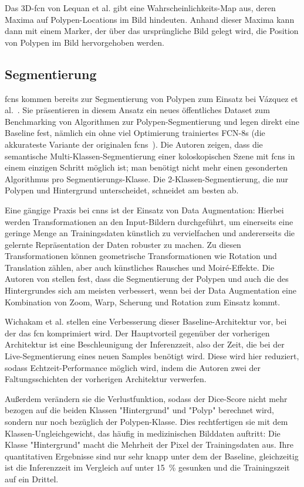 Das 3D-\gls{fcn} von Lequan et al. gibt eine Wahrscheinlichkeits-Map aus, deren Maxima auf Polypen-Locations im Bild hindeuten.
Anhand dieser Maxima kann dann mit einem Marker, der über das ursprüngliche Bild gelegt wird, die Position von Polypen im Bild hervorgehoben werden.

\subsection{Segmentierung}

\glspl{fcn} kommen bereits zur Segmentierung von Polypen zum Einsatz bei Vázquez et al.~\cite{Vazquez.2017}.
Sie präsentieren in diesem Ansatz ein neues öffentliches Dataset zum Benchmarking von Algorithmen zur Polypen-Segmentierung und legen direkt eine Baseline fest, nämlich ein ohne viel Optimierung trainiertes FCN-8s (die akkurateste Variante der originalen \glspl{fcn}~\cite{Long.2015}).
Die Autoren zeigen, dass die semantische Multi-Klassen-Segmentierung einer koloskopischen Szene mit \glspl{fcn} in einem einzigen Schritt möglich ist; man benötigt nicht mehr einen gesonderten Algorithmus pro Segmentierungs-Klasse.
Die 2-Klassen-Segmentierung, die nur Polypen und Hintergrund unterscheidet, schneidet am besten ab.

Eine gängige Praxis bei \glspl{cnn} ist der Einsatz von Data Augmentation:
Hierbei werden Transformationen an den Input-Bildern durchgeführt, um einerseits eine geringe Menge an Trainingsdaten künstlich zu vervielfachen und andererseits die gelernte Repräsentation der Daten robuster zu machen.
Zu diesen Transformationen können geometrische Transformationen wie Rotation und Translation zählen, aber auch künstliches Rausches und Moiré-Effekte.
Die Autoren von \cite{Vazquez.2017} stellen fest, dass die Segmentierung der Polypen und auch die des Hintergrundes sich am meisten verbessert, wenn bei der Data Augmentation eine Kombination von Zoom, Warp, Scherung und Rotation zum Einsatz kommt.

Wichakam et al. \cite{Wichakam.2018} stellen eine Verbesserung dieser Baseline-Architektur vor, bei der das \gls{fcn} komprimiert wird.
Der Hauptvorteil gegenüber der vorherigen Architektur ist eine Beschleunigung der Inferenzzeit, also der Zeit, die bei der Live-Segmentierung eines neuen Samples benötigt wird.
Diese wird hier reduziert, sodass Echtzeit-Performance möglich wird, indem die Autoren zwei der Faltungsschichten der vorherigen Architektur verwerfen.

Außerdem verändern sie die Verlustfunktion, sodass der Dice-Score nicht mehr bezogen auf die beiden Klassen "Hintergrund" und "Polyp" berechnet wird, sondern nur noch bezüglich der Polypen-Klasse.
Dies rechtfertigen sie mit dem Klassen-Ungleichgewicht, das häufig in medizinischen Bilddaten auftritt:
Die Klasse "Hintergrund" macht die Mehrheit der Pixel der Trainingsdaten aus.
Ihre quantitativen Ergebnisse sind nur sehr knapp unter dem der Baseline, gleichzeitig ist die Inferenzzeit im Vergleich auf unter 15~\% gesunken und die Trainingszeit auf ein Drittel.

